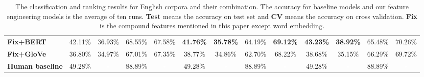 \begin{table}[ht]
\begin{center}
\begin{tabular}{lcccccccccccc}
			\textbf{Fix+BERT}&42.11\%&36.93\%&68.55\%&67.58\%&\textbf{41.76\%}&\textbf{35.78\%}&64.19\%&\textbf{69.12\%}&\textbf{43.23\%}&\textbf{38.92\%}&65.48\%&70.26\%\\
			\textbf{Fix+GloVe}&36.80\%&34.97\%&67.01\%&67.35\%&38.77\%&34.86\%&62.70\%&68.22\%&38.68\%&35.15\%&66.29\%&69.72\%\\\hline\hline
			\textbf{Human baseline}&49.28\%&-&88.89\%&-&49.28\%&-&88.89\%&-&49.28\%&-&88.89\%&-\\\hline
		\end{tabular}
	\end{center}
\vspace{-0.25cm}
	\caption{\label{tab:resultsEnglish} 
		The classification and ranking results 
		for English corpora and their combination.
		The accuracy for baseline models and our feature engineering models is the average of ten runs.
		\textbf{Test} means the accuracy on test set and \textbf{CV} means the accuracy on cross validation.
		\textbf{Fix} is the compound features mentioned in this paper except word embedding.}
\end{table}

